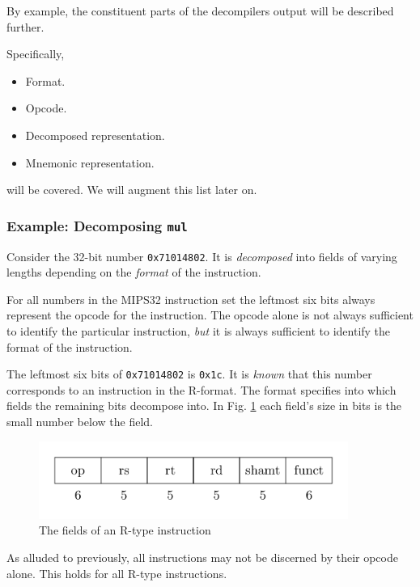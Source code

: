 By example, the constituent parts of the decompilers output will
be described further.

Specifically,

\begin{itemize}
  \item Format.
  \item Opcode.
  \item Decomposed representation.
  \item Mnemonic representation.
\end{itemize}

will be covered. We will augment this list later on.

\subsubsection{Example: Decomposing \texttt{mul}}

Consider the 32-bit number \texttt{0x71014802}. It is \emph{decomposed}
into fields of varying lengths depending on the \emph{format} of the
instruction.

For all numbers in the MIPS32 instruction set the leftmost six bits
always represent the opcode for the instruction. The opcode alone is
not always sufficient to identify the particular instruction,
\emph{but} it is always sufficient to identify the format of the
instruction.

The leftmost six bits of \texttt{0x71014802} is \texttt{0x1c}. It is
\emph{known} that this number corresponds to an instruction in the
R-format. The format specifies into which fields the remaining bits
decompose into. In Fig. \ref{fig:r-decomposed} each field's size in
bits is the small number below the field.

\begin{figure}[H]
  \centering
  \includegraphics[width=0.9\textwidth]{figures/r-decomposed.png}
  \caption{The fields of an R-type instruction}
  \label{fig:r-decomposed}
\end{figure}

As alluded to previously, all instructions may not be discerned by
their opcode alone. This holds for all R-type instructions.

